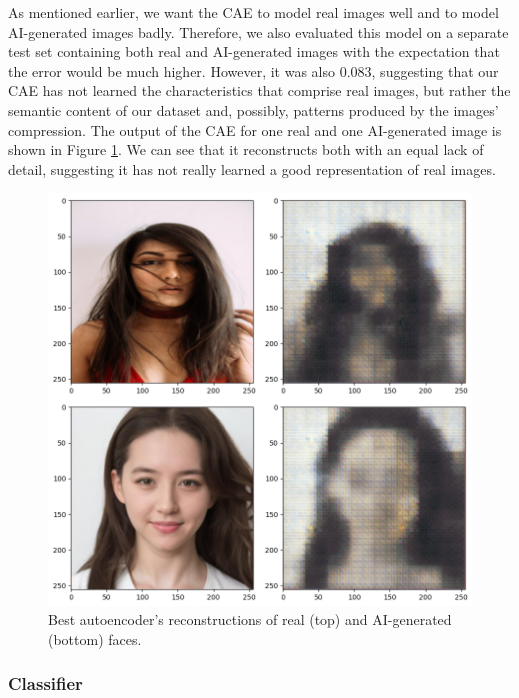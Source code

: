 \documentclass{article} %
\begin{document}
As mentioned earlier, we want the CAE to model real images well and to model AI-generated images badly. Therefore, we also evaluated this model on a separate test set containing both real and AI-generated images with the expectation that the error would be much higher. However, it was also $0.083$, suggesting that our CAE has not learned the characteristics that comprise real images, but rather the semantic content of our dataset and, possibly, patterns produced by the images' compression. The output of the CAE for one real and one AI-generated image is shown in Figure \ref{fig:reconstructions}. We can see that it reconstructs both with an equal lack of detail, suggesting it has not really learned a good representation of real images.

\begin{figure}[h]
    \begin{center}
        \includegraphics[scale=0.25]{figs/reconstructions.png}
    \end{center}
    \caption{Best autoencoder's reconstructions of real (top) and AI-generated (bottom) faces.}
    \label{fig:reconstructions}
\end{figure}

\subsubsection{Classifier}
\end{document}
